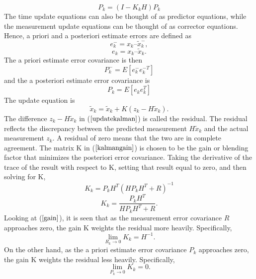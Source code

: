 \documentclass[journal]{IEEEtran}
\begin{document}
\begin{equation}
P_k = (I-K_kH)P_k
\end{equation}
The time update equations can also be thought of as predictor
equations, while the measurement update equations can be thought of
as corrector equations.
\newline
Hence, a priori and a posteriori estimate errors are defined as
\begin{equation}
e_k^- = x_k – \tilde x_k^- ,
\end{equation}
\begin{equation}
e_k =  x_k – \tilde x_k.
\end{equation}
The a priori estimate error covariance is then
\begin{equation}
P_k^- = E[ e_k^- e_k^{-T} ]
\end{equation}
and the a posteriori estimate error covariance is
\begin{equation}
P_k = E[e_k e_k^T]
\end{equation}
The update equation is
\begin{equation}
\tilde x_k = \tilde x_k + K(z_k-H\tilde x_k).
\label{updatekalman}
\end{equation}
The difference $z_k - H\tilde x_k$ in ($\ref{updatekalman}$) is called
the residual. The residual reflects the discrepancy between the
predicted measurement $H\tilde x_k$ and the actual measurement
$z_k$. A residual of zero means that the two are in complete
agreement. \newline
The matrix K in ($\ref{kalmangain}$) is
chosen to be the gain or blending factor that minimizes the
posteriori error covariance. Taking the derivative of the trace of
the result with respect to K, setting that result equal to zero, and
then solving for K,
\begin{equation}
K_k = P_kH^{T}(HP_kH^{T} + R)^{-1}
\end{equation}
\begin{equation}
K_k = \frac{P_kH^T}{HP_kH^T + R}. \label{gain}
\end{equation}
Looking at ($\ref{gain}$), it is seen that as the measurement error
covariance $R$ approaches zero, the gain K weights the residual more
heavily. Specifically,
\begin{equation}
\mathop {\lim }\limits_{R_k \to 0 } {K_k} = H^{-1}.
\end{equation}
On the other hand, as the a priori estimate error covariance $P_k$
approaches zero, the gain K weights the residual less heavily.
Specifically,
\begin{equation}
\mathop {\lim }\limits_{P_k \to 0 } {K_k} = 0.
\end{equation}
\end{document}

